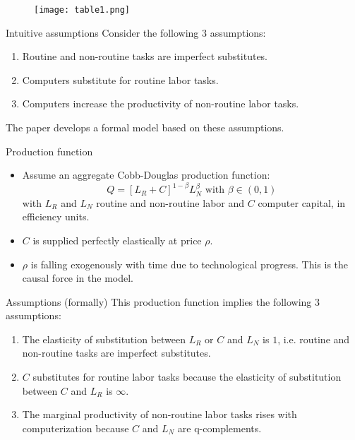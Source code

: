 \documentclass[notes=show]{beamer}
\begin{document}
\newpage
\begin{center}
\begin{figure}
\texttt{[image: table1.png]}
\end{figure} 
\end{center}
\newpage

\begin{frame}{Intuitive assumptions}
Consider the following 3 assumptions: \medskip
\begin{enumerate}
\item Routine and non-routine tasks are imperfect substitutes. \medskip
\item Computers substitute for routine labor tasks.\medskip
\item Computers increase the productivity of non-routine labor tasks.
\end{enumerate} \medskip
The paper develops a formal model based on these assumptions.
\end{frame}

\begin{frame}{Production function}
\begin{itemize}
\item Assume an aggregate Cobb-Douglas production function:
\[
Q=[L_{R}+C]^{1- \beta}L_{N}^{ \beta} \text{ with } \beta \in (0,1)  \tag{1}  \label{eq1}
\]
with $L_{R}$ and $L_{N}$ routine and non-routine labor and $C$ computer capital, in efficiency units. \bigskip
\item $C$ is supplied perfectly elastically at price $ \rho $. \bigskip
\item $ \rho $ is falling exogenously with time due to technological progress. This is the causal force in the model.
\end{itemize}
\end{frame}

\begin{frame}{Assumptions (formally)}
This production function implies the following 3 assumptions:
\begin{enumerate} \medskip
\item The elasticity of substitution between $L_{R}$ or $C$ and $L_{N}$ is $1$, i.e. routine and non-routine tasks are imperfect substitutes. \medskip
\item $C$ substitutes for routine labor tasks because the elasticity of substitution between $C$ and $L_{R}$ is $\infty $. \medskip
\item The marginal productivity of non-routine labor tasks rises with computerization because $C$ and $L_{N}$ are q-complements.
\end{enumerate}
\end{frame}
\end{document}

